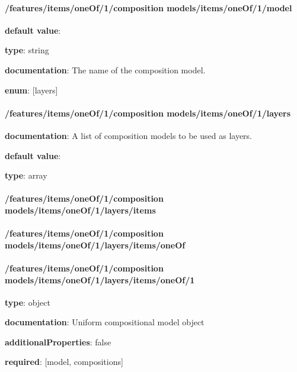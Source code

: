 \paragraph{/features/items/oneOf/1/composition models/items/oneOf/1/model} \begin{itemized}
\item {\bf default value}: 
\item {\bf type}: string
\item {\bf documentation}: The name of the composition model.
\item {\bf enum}: [layers]\end{itemized}\paragraph{/features/items/oneOf/1/composition models/items/oneOf/1/layers} \begin{itemized}
\item {\bf documentation}: A list of composition models to be used as layers.
\item {\bf default value}: 
\item {\bf type}: array
\paragraph{/features/items/oneOf/1/composition models/items/oneOf/1/layers/items} \begin{itemized}
\end{itemized}\end{itemized}\paragraph{/features/items/oneOf/1/composition models/items/oneOf/1/layers/items/oneOf} \begin{itemized}
\end{itemized}\paragraph{/features/items/oneOf/1/composition models/items/oneOf/1/layers/items/oneOf/1} \begin{itemized}
\item {\bf type}: object
\item {\bf documentation}: Uniform compositional model object
\item {\bf additionalProperties}: false
\item {\bf required}: [model, compositions]\end{itemized}
